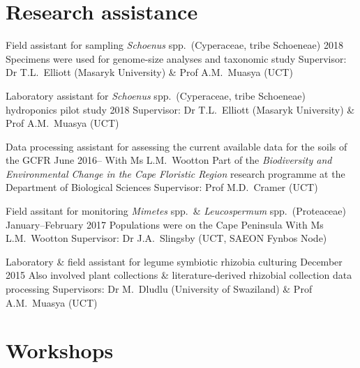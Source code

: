 \documentclass[10pt]{article}
\begin{document}
\section*{Research assistance} %

\begin{hangparas}{2em}{1}

Field assistant for sampling \textit{Schoenus} spp.~(Cyperaceae, tribe 
Schoeneae)                                                    \hfill 2018 \break
Specimens were used for genome-size analyses and taxonomic study          \break
Supervisor: Dr T.L.~Elliott (Masaryk University) \& Prof A.M.~Muasya (UCT)

Laboratory assistant for \textit{Schoenus} spp.~(Cyperaceae, tribe Schoeneae) 
hydroponics pilot study                                       \hfill 2018 \break
Supervisor: Dr T.L.~Elliott (Masaryk University) \& Prof A.M.~Muasya (UCT)

Data processing assistant for assessing the current available data for the 
soils of the GCFR                                      \hfill June 2016-- \break
With Ms L.M.~Wootton                                                      \break
Part of the \textit{Biodiversity and Environmental Change in the Cape Floristic 
Region} research programme at the Department of Biological Sciences       \break
Supervisor: Prof M.D.~Cramer (UCT)

Field assitant for monitoring \textit{Mimetes} spp.~\& \textit{Leucospermum} 
spp.~(Proteaceae)                           \hfill January--February 2017 \break
Populations were on the Cape Peninsula                                    \break
With Ms L.M.~Wootton                                                      \break
Supervisor: Dr J.A.~Slingsby (UCT, SAEON Fynbos Node)

Laboratory \& field assistant for legume symbiotic rhizobia culturing
                                                     \hfill December 2015 \break
Also involved plant collections \& literature-derived rhizobial collection 
data processing                                                           \break
Supervisors: Dr M.~Dludlu (University of Swaziland) \& Prof A.M.~Muasya (UCT)


\hfill

\end{hangparas}

\section*{Workshops} %
\end{document}
